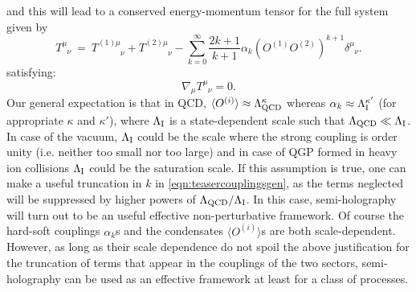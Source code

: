 \documentclass[prd,reprint,a4paper,showpacs,superscriptaddress,11pt,onecolumn,nofootinbib]{revtex4-1}
\renewcommand{\(}{\left(}
\renewcommand{\)}{\right)}
\newcommand{\6}{\partial}
\begin{document}
 and this will lead to a conserved energy-momentum tensor for the full system given by 
 \begin{equation}\label{fullTsimplegen}
T^\mu_{\phantom{\mu}\nu} ~ = ~ T^{(1)\mu}_{\phantom{(1)\mu}\nu} + T^{(2)\mu}_{\phantom{(2)\mu}\nu} -\sum_{k= 0}^\infty\frac{2k+1}{k+1}\alpha_k \left(O^{(1)}O^{(2)}\right)^{k+1} \delta^\mu_{\phantom{\mu}\nu}.
\end{equation}
satisfying:
\begin{equation}
\nabla_\mu T^{\mu}_{\phantom{\mu}\nu} = 0.
\end{equation}
Our general expectation is that in QCD, $\langle O^{(i)} \rangle \approx \Lambda_{\rm QCD}^\kappa$ whereas $\alpha_k \approx \Lambda_{\rm I}^{\kappa'}$ (for appropriate $\kappa$ and $\kappa'$), where $\Lambda_{\rm I}$ is a state-dependent scale such that $\Lambda_{\rm QCD} \ll \Lambda_{\rm I}$. In case of the vacuum, $\Lambda_{\rm I}$ could be the scale where the strong coupling is order unity (i.e. neither too small nor too large) and in case of QGP formed in heavy ion collisions $\Lambda_{\rm I}$ could be the saturation scale. If this assumption is true, one can make a useful truncation in $k$ in \eqref{eqn:teasercouplingsgen}, as the terms neglected will be suppressed by higher powers of $\Lambda_{\rm QCD}/\Lambda_{\rm I}$. In this case, semi-holography will turn out to be an useful effective non-perturbative framework. Of course the hard-soft couplings $\alpha_k$s and the condensates $\langle O^{(i)} \rangle$s are both scale-dependent. However, as long as their scale dependence do not spoil the above justification for the truncation of terms that appear in the couplings of the two sectors, semi-holography can be used as an effective framework at least for a class of processes.
\end{document}
